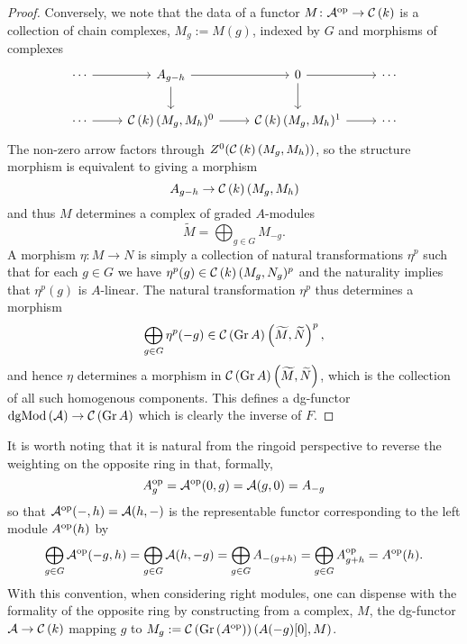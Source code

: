 \begin{lemma}
\begin{proof}
    Conversely, we note that the data of a functor \(M \colon \mathcal{A}^{\operatorname{op}} \to \mathcal{C}\left(k\right)\) is a collection of chain complexes, \(M_g := M(g)\), indexed by \(G\) and morphisms of complexes
    \[\begin{tikzcd}
    \cdots \arrow{r} & A_{g - h} \arrow{r}\arrow{d} & 0 \arrow{r}\arrow{d} & \cdots\\
    \cdots \arrow{r} & \CH{k}(M_g,M_h)^0 \arrow{r} & \CH{k}(M_g, M_h)^1 \arrow{r} & \cdots
    \end{tikzcd}\]    The non-zero arrow factors through \(Z^0(\mathcal{C}\left(k\right)(M_g, M_h))\), so the structure morphism is equivalent to giving a morphism
    \[A_{g - h} \to \mathcal{C}\left(k\right)(M_g,M_h)\]
    and thus \(M\) determines a complex of graded \(A\)-modules
    \[\widetilde{M} = \bigoplus_{g \in G}M_{-g}.\]
    A morphism \(\eta \colon M \to N\) is simply a collection of natural transformations \(\eta^p\) such that for each \(g \in G\) we have \(\eta^p(g) \in \mathcal{C}\left(k\right)(M_g,N_g)^p\) and the naturality implies that \(\eta^p(g)\) is \(A\)-linear.
    The natural transformation \(\eta^p\) thus determines a morphism
    \[\bigoplus_{g \in G} \eta^p(-g) \in \mathcal{C}\left(\operatorname{Gr}A\right)\left(\widetilde{M}, \widetilde{N}\right)^p,\]
    and hence \(\eta\) determines a morphism in \(\mathcal{C}\left(\operatorname{Gr}A\right)\left(\widetilde{M}, \widetilde{N}\right)\), which is the collection of all such homogenous components.
    This defines a dg-functor \(\operatorname{dgMod}\left(\mathcal{A}\right) \to \mathcal{C}\left(\operatorname{Gr}A\right)\) which is clearly the inverse of \(F\).
  \end{proof}
\end{lemma}

\begin{remark}
  It is worth noting that it is natural from the ringoid perspective to reverse the weighting on the opposite ring in that, formally,
  \[A^{\operatorname{op}}_{g} = \mathcal{A}^{\operatorname{op}}(0,g) = \mathcal{A}(g,0) = A_{-g}\]
  so that \(\mathcal{A}^{\operatorname{op}}(-, h) = \mathcal{A}(h,-)\) is the representable functor corresponding to the left module \(A^{\operatorname{op}}(h)\) by
  \[\bigoplus_{g \in G} \mathcal{A}^{\operatorname{op}}(-g,h) = \bigoplus_{g \in G} \mathcal{A}(h,-g) = \bigoplus_{g \in G} A_{-(g + h)} = \bigoplus_{g \in G} A^{\operatorname{op}}_{g + h} = A^{\operatorname{op}}(h).\]
  With this convention, when considering right modules, one can dispense with the formality of the opposite ring by constructing from a complex, \(M\), the dg-functor \(\mathcal{A} \to \mathcal{C}\left(k\right)\) mapping \(g\) to \(M_g := \mathcal{C}\left(\operatorname{Gr}\left(A^{{\operatorname{op}}}\right)\right)(A(-g)[0], M)\).
\end{remark}

